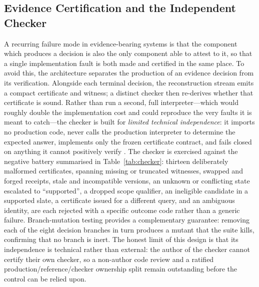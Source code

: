 \subsection{Evidence Certification and the Independent Checker}
\label{sec:checker}
A recurring failure mode in evidence-bearing systems is that the component which produces a decision is
also the only component able to attest to it, so that a single implementation fault is both made and
certified in the same place. To avoid this, the architecture separates the production of an evidence
decision from its verification. Alongside each terminal decision, the reconstruction stream emits a
compact certificate and witness; a distinct checker then re-derives whether that certificate is sound.
Rather than run a second, full interpreter---which would roughly double the implementation cost and
could reproduce the very faults it is meant to catch---the checker is built for \emph{limited technical
independence}: it imports no production code, never calls the production interpreter to determine the
expected answer, implements only the frozen certificate contract, and fails closed on anything it
cannot positively verify \cite{selectivepred, groundedgen}. The checker is exercised against the
negative battery summarised in Table~\ref{tab:checker}: thirteen deliberately malformed certificates,
spanning missing or truncated witnesses, swapped and forged receipts, stale and incompatible versions,
an unknown or conflicting state escalated to ``supported'', a dropped scope qualifier, an ineligible
candidate in a supported slate, a certificate issued for a different query, and an ambiguous identity,
are each rejected with a specific outcome code rather than a generic failure. Branch-mutation testing
provides a complementary guarantee: removing each of the eight decision branches in turn produces a
mutant that the suite kills, confirming that no branch is inert. The honest limit of this design is that
its independence is technical rather than external: the author of the checker cannot certify their own
checker, so a non-author code review and a ratified production/reference/checker ownership split remain
outstanding before the control can be relied upon.

